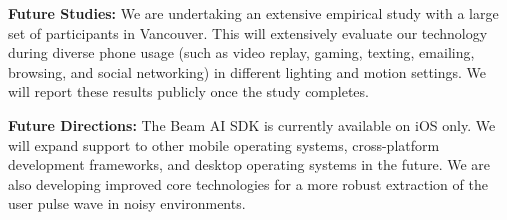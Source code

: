 \documentclass{article}
\begin{document}
\textbf{Future Studies:} We are undertaking an extensive empirical study with a large set of participants in Vancouver. This will extensively evaluate our technology during diverse phone usage (such as video replay, gaming, texting, emailing, browsing, and social networking) in different lighting and motion settings. We will report these results publicly once the study completes.

\textbf{Future Directions:} The Beam AI SDK is currently available on iOS only. We will expand support to other mobile operating systems, cross-platform development frameworks, and desktop operating systems in the future. We are also developing improved core technologies for a more robust extraction of the user pulse wave in noisy environments.



\end{document}
